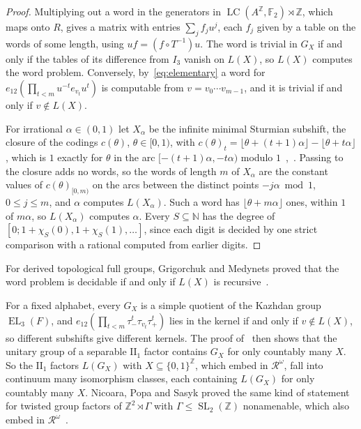 \documentclass[11pt]{amsart}
\newcommand{\F}{\mathbb F}
\newcommand{\Z}{\mathbb Z}
\newcommand{\LC}{\operatorname{LC}}
\newcommand{\EL}{\operatorname{EL}}
\newcommand{\SL}{\operatorname{SL}}
\begin{document}
\begin{proof}
Multiplying out a word in the generators in $\LC(A^{\Z},\F_2)\rtimes\Z$,
which maps onto $R$, gives a matrix with entries $\sum_jf_ju^j$, each
$f_j$ given by a table on the words of some length, using
$uf=(f\circ T^{-1})u$. The word is trivial in $G_X$ if and only if the
tables of its difference from $I_3$ vanish on $L(X)$, so $L(X)$ computes
the word problem. Conversely, by~\eqref{eq:elementary} a word for
$e_{12}(\prod_{t<m}u^{-t}e_{v_t}u^t)$ is computable from
$v=v_0\cdots v_{m-1}$, and it is trivial if and only if $v\notin L(X)$.

For irrational $\alpha\in(0,1)$ let $X_\alpha$ be the infinite minimal
Sturmian subshift, the closure of the codings $c(\theta)$,
$\theta\in[0,1)$, with
$c(\theta)_t=\lfloor\theta+(t+1)\alpha\rfloor-\lfloor\theta+t\alpha\rfloor$,
which is $1$ exactly for $\theta$ in the arc $[-(t+1)\alpha,-t\alpha)$
modulo $1$~\cite{MorseHedlund,Hedlund44},~\cite[Chapter~2]{Lothaire}.
Passing to the closure adds no words, so the words of length $m$ of
$X_\alpha$ are the constant values of $c(\theta)_{[0,m)}$ on the arcs
between the distinct points $-j\alpha\bmod1$, $0\le j\le m$, and $\alpha$
computes $L(X_\alpha)$. Such a word has $\lfloor\theta+m\alpha\rfloor$
ones, within $1$ of $m\alpha$, so $L(X_\alpha)$ computes $\alpha$. Every
$S\subseteq\mathbb N$ has the degree of
$[0;1+\chi_S(0),1+\chi_S(1),\dots]$, since each digit is decided by one
strict comparison with a rational computed from earlier digits.
\end{proof}

For derived topological full groups, Grigorchuk and Medynets proved that
the word problem is decidable if and only if $L(X)$ is
recursive~\cite[Theorem~1.1(3)]{GMpres}.

For a fixed alphabet, every $G_X$ is a simple quotient of the Kazhdan group
$\EL_3(F)$, and $e_{12}(\prod_{t<m}\tau_-^t\tau_{v_t}\tau_+^t)$ lies in
the kernel if and only if $v\notin L(X)$, so different subshifts give
different kernels. The proof of~\cite[Theorem~2]{OzawaUniversal} then
shows that the unitary group of a separable $\mathrm{II}_1$ factor
contains $G_X$ for only countably many $X$. So the $\mathrm{II}_1$
factors $L(G_X)$ with $X\subseteq\{0,1\}^{\Z}$, which embed in
$\mathcal R^\omega$, fall into continuum many isomorphism classes, each
containing $L(G_X)$ for only countably many $X$. Nicoara, Popa and Sasyk
proved the same kind of statement for twisted group factors of
$\Z^2\rtimes\Gamma$ with $\Gamma\le\SL_2(\Z)$ nonamenable, which also
embed in $\mathcal R^\omega$~\cite[Theorem~0.1]{NPS}.
\end{document}

